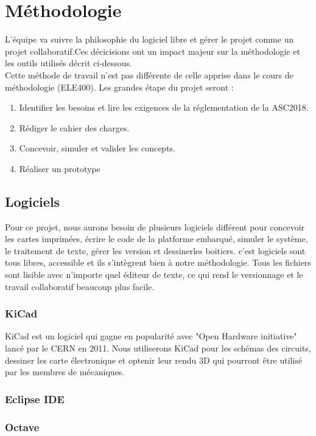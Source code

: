 \section{Méthodologie}
L'équipe va suivre la philosophie du logiciel libre et gérer le projet comme un projet collaboratif.Ces décicisions 
ont un impact majeur sur la méthodologie et les outils utilisés décrit ci-dessous. \\
Cette méthode de travail n'est pas différente de celle apprise dans le cours de méthodologie (ELE400). Les grandes étape du projet seront : \\
\begin{enumerate}
	\item Identifier les besoins et lire les exigences de la réglementation de la ASC2018.
	\item Rédiger le cahier des charges.
	\item Concevoir, simuler et valider les concepts.
	\item Réaliser un prototype
\end{enumerate}

\subsection{Logiciels}
Pour ce projet, nous aurons besoin de plusieurs logiciels différent pour concevoir les cartes imprimées, écrire le code de la platforme embarqué, simuler le système, le traitement de texte, gérer les version et dessinerles boitiers. c'est logiciels sont tous libres, accessible et ils s'intègrent bien à notre méthodologie. Tous les fichiers sont lisible avec n'importe quel éditeur de texte, ce qui rend le versionnage et le travail collaboratif beaucoup plus facile.\\

\subsubsection{KiCad}
KiCad est un logiciel qui gagne en popularité avec "Open Hardware initiative" lancé par le CERN en 2011. Nous utiliserons KiCad pour les schémas des circuits, dessiner les carte électronique et optenir
leur rendu 3D qui pourront être utilisé par les membres de mécaniques.

\subsubsection{Eclipse IDE}


\subsubsection{Octave}


